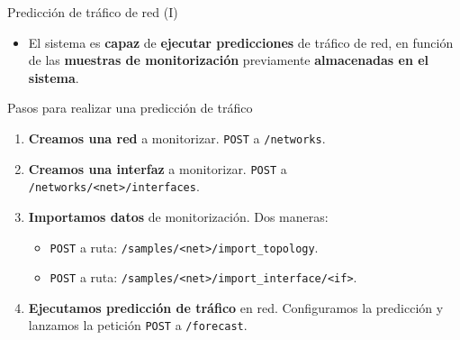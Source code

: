 \documentclass[aspectratio=169,xcolor=dvipsnames]{beamer}
\begin{document}
	\begin{frame}{Predicción de tráfico de red (I)}
		\begin{itemize}
			\item El sistema es \textbf{capaz} de \textbf{ejecutar predicciones} de tráfico de red, en función de las \textbf{muestras de monitorización} previamente \textbf{almacenadas en el sistema}.
		\end{itemize}
	
		\begin{exampleblock}{Pasos para realizar una predicción de tráfico}
			\begin{enumerate}
				\item \textbf{Creamos una red} a monitorizar. \texttt{POST} a \texttt{/networks}.
				
				\item \textbf{Creamos una interfaz} a monitorizar. \texttt{POST} a \texttt{/networks/<net>/interfaces}.
				
				\item \textbf{Importamos datos} de monitorización.  Dos maneras: 
				\begin{itemize}
					\item \texttt{POST} a ruta: \texttt{/samples/<net>/import\_topology}.
					
					\item \texttt{POST} a ruta: \texttt{/samples/<net>/import\_interface/<if>}.
				\end{itemize}
			
				\item \textbf{Ejecutamos predicción de tráfico} en red. Configuramos la predicción y lanzamos la petición \texttt{POST} a \texttt{/forecast}.
			\end{enumerate}
		\end{exampleblock}
	\end{frame}
	
	
\end{document}
